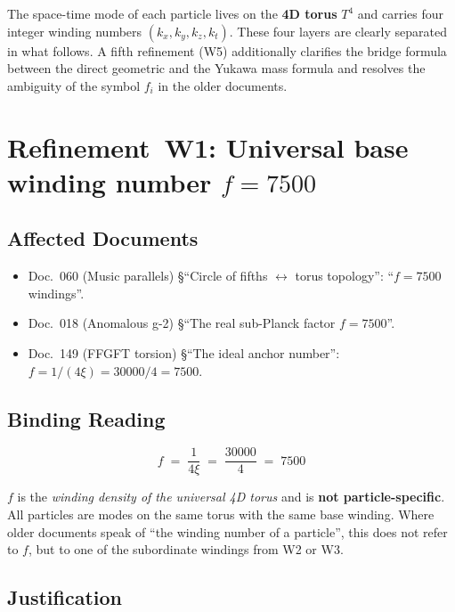The space-time mode of each particle lives on the \textbf{4D torus}
$T^4$ and carries four integer winding numbers $(k_x, k_y, k_z, k_t)$.
These four layers are clearly separated in what follows. A fifth
refinement (W5) additionally clarifies the bridge formula between the
direct geometric and the Yukawa mass formula and resolves the
ambiguity of the symbol $f_i$ in the older documents.

\section{\texorpdfstring{Refinement~W1: Universal base winding number $f = 7500$}{Refinement W1: Universal base winding number f = 7500}}

\subsection*{Affected Documents}

\begin{itemize}
  \item Doc.~060 (Music parallels) §\enquote{Circle of fifths
        $\leftrightarrow$ torus topology}: \enquote{$f = 7500$ windings}.
  \item Doc.~018 (Anomalous g-2) §\enquote{The real sub-Planck factor
        $f = 7500$}.
  \item Doc.~149 (FFGFT torsion) §\enquote{The ideal anchor number}:
        $f = 1/(4\xi) = 30000/4 = 7500$.
\end{itemize}

\subsection*{Binding Reading}

\begin{equation}
  \boxed{\;f \;=\; \frac{1}{4\xi} \;=\; \frac{30000}{4} \;=\; 7500\;}
  \tag{210.1}
\end{equation}

$f$ is the \emph{winding density of the universal 4D torus} and is
\textbf{not particle-specific}. All particles are modes on the same
torus with the same base winding. Where older documents speak of
\enquote{the winding number of a particle}, this does not refer to
$f$, but to one of the subordinate windings from W2 or W3.

\subsection*{Justification}


